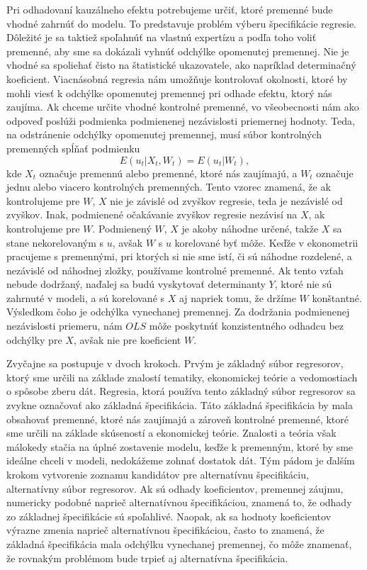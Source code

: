 \documentclass[]{tukediphc}
\begin{document}
Pri odhadovaní kauzálneho efektu potrebujeme určiť, ktoré premenné bude vhodné zahrnúť do modelu. To predstavuje problém výberu špecifikácie regresie. Dôležité je sa taktiež spoľahnúť na vlastnú expertízu a podľa toho voliť premenné, aby sme sa dokázali vyhnúť odchýlke opomenutej premennej. Nie je vhodné sa spoliehať čisto na štatistické ukazovatele, ako napríklad determinačný koeficient.
Viacnásobná regresia nám umožňuje kontrolovať okolnosti, ktoré by mohli viesť k odchýlke opomenutej premennej pri odhade efektu, ktorý nás zaujíma.
Ak chceme určite vhodné kontrolné premenné, vo všeobecnosti nám ako odpoveď poslúži podmienka podmienenej nezávislosti priemernej hodnoty. Teda, na odstránenie odchýlky opomenutej premennej, musí súbor kontrolných premenných spĺňať podmienku
\begin{equation}
    E(u_{t}|X_{t},W_{t}) = E(u_{t}|W_{t}),
\end{equation}
kde $X_{t}$ označuje premennú alebo premenné, ktoré nás zaujímajú, a $W_{t}$ označuje jednu alebo viacero kontrolných premenných.
Tento vzorec znamená, že ak kontrolujeme pre $W$, $X$ nie je závislé od zvyškov regresie, teda je nezávislé od zvyškov. Inak, podmienené očakávanie zvyškov regresie nezávisí na $X$, ak kontrolujeme pre $W$. Podmienený $W$, $X$ je akoby náhodne určené, takže $X$ sa stane nekorelovaným s $u$, avšak $W$ s $u$ korelované byť môže. Keďže v ekonometrii pracujeme s premennými, pri ktorých si nie sme istí, či sú náhodne rozdelené, a nezávislé od náhodnej zložky, používame kontrolné premenné. Ak tento vzťah nebude dodržaný, naďalej sa budú vyskytovať determinanty $Y$, ktoré nie sú zahrnuté v modeli, a sú korelované s $X$ aj napriek tomu, že držíme $W$ konštantné. Výsledkom čoho je odchýlka vynechanej premennej. Za dodržania podmienenej nezávislosti priemeru, nám $OLS$ môže poskytnúť konzistentného odhadcu bez odchýlky pre $X$, avšak nie pre koeficient $W$. 

Zvyčajne sa postupuje v dvoch krokoch. Prvým je základný súbor regresorov, ktorý sme určili na základe znalostí tematiky, ekonomickej teórie a vedomostiach o spôsobe zberu dát. Regresia, ktorá používa tento základný súbor regresorov sa zvykne označovať ako základná špecifikácia. Táto základná špecifikácia by mala obsahovať premenné, ktoré nás zaujímajú a zároveň kontrolné premenné, ktoré sme určili na základe skúseností a ekonomickej teórie. Znalosti a teória však málokedy stačia na úplné zostavenie modelu, keďže k premenným, ktoré by sme ideálne chceli v modeli, nedokážeme zohnať dostatok dát. Tým pádom je ďalším krokom vytvorenie zoznamu kandidátov pre alternatívnu špecifikáciu, alternatívny súbor regresorov. Ak sú odhady koeficientov, premennej záujmu, numericky podobné naprieč alternatívnou špecifikáciou, znamená to, že odhady zo základnej špecifikácie sú spoľahlivé. Naopak, ak sa hodnoty koeficientov výrazne zmenia naprieč alternatívnou špecifikáciou, často to znamená, že základná špecifikácia mala odchýlku vynechanej premennej, čo môže znamenať, že rovnakým problémom bude trpieť aj alternatívna špecifikácia. 
\end{document}
